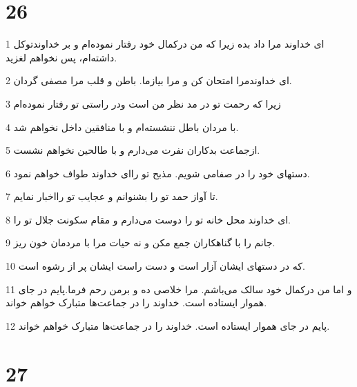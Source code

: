 \chapter{26}

\par 1 ای خداوند مرا داد بده زیرا که من درکمال خود رفتار نموده‌ام و بر خداوندتوکل داشته‌ام، پس نخواهم لغزید.
\par 2 ‌ای خداوندمرا امتحان کن و مرا بیازما. باطن و قلب مرا مصفی گردان.
\par 3 زیرا که رحمت تو در مد نظر من است ودر راستی تو رفتار نموده‌ام
\par 4 با مردان باطل ننشسته‌ام و با منافقین داخل نخواهم شد.
\par 5 ازجماعت بدکاران نفرت می‌دارم و با طالحین نخواهم نشست.
\par 6 دستهای خود را در صفامی شویم. مذبح تو را‌ای خداوند طواف خواهم نمود.
\par 7 تا آواز حمد تو را بشنوانم و عجایب تو رااخبار نمایم.
\par 8 ‌ای خداوند محل خانه تو را دوست می‌دارم و مقام سکونت جلال تو را.
\par 9 جانم را با گناهکاران جمع مکن و نه حیات مرا با مردمان خون ریز.
\par 10 که در دستهای ایشان آزار است و دست راست ایشان پر از رشوه است.
\par 11 و اما من درکمال خود سالک می‌باشم. مرا خلاصی ده و برمن رحم فرما.پایم در جای هموار ایستاده است. خداوند را در جماعت‌ها متبارک خواهم خواند.
\par 12 پایم در جای هموار ایستاده است. خداوند را در جماعت‌ها متبارک خواهم خواند.
 
\chapter{27}

